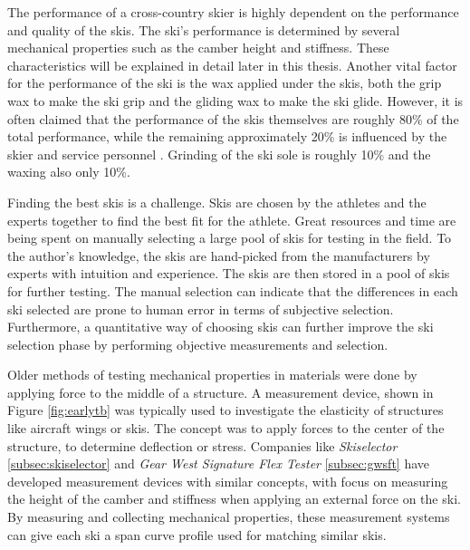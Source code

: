 The performance of a cross-country skier is highly dependent on the performance and quality of the skis. The ski's performance is determined by several mechanical properties such as the camber height and stiffness. These characteristics will be explained in detail later in this thesis. Another vital factor for the performance of the ski is the wax applied under the skis, both the grip wax to make the ski grip and the gliding wax to make the ski glide. However, it is often claimed that the performance of the skis themselves are roughly 80\% of the total performance, while the remaining approximately 20\% is influenced by the skier and service personnel \citep{ronbeck_vikander_2007,ronbeck_2001}. Grinding of the ski sole is roughly 10\% and the waxing also only 10\%. 

Finding the best skis is a challenge. Skis are chosen by the athletes and the experts together to find the best fit for the athlete. Great resources and time are being spent on manually selecting a large pool of skis for testing in the field. To the author's knowledge, the skis are hand-picked from the manufacturers by experts with intuition and experience. The skis are then stored in a pool of skis for further testing. The manual selection can indicate that the differences in each ski selected are prone to human error in terms of subjective selection. Furthermore, a quantitative way of choosing skis can further improve the ski selection phase by performing objective measurements and selection.

Older methods of testing mechanical properties in materials were done by applying force to the middle of a structure. A measurement device, shown in Figure \ref{fig:earlytb} was typically used to investigate the elasticity of structures like aircraft wings or skis. The concept was to apply forces to the center of the structure, to determine deflection or stress.
Companies like \textit{Skiselector} \ref{subsec:skiselector} and \textit{Gear West Signature Flex Tester} \ref{subsec:gwsft} have developed measurement devices with similar concepts, with focus on measuring the height of the camber and stiffness when applying an external force on the ski. By measuring and collecting mechanical properties, these measurement systems can give each ski a span curve profile used for matching similar skis.

